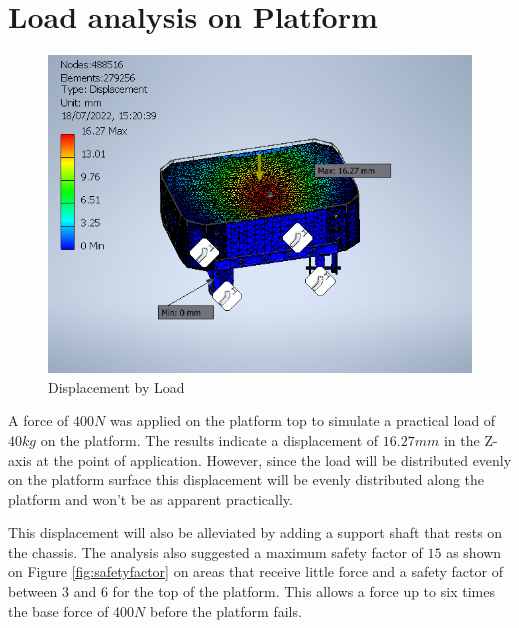 \section{Load analysis on Platform}

\begin{figure}[H]
    \centering
    \includegraphics[scale = 0.9]{Figures/PlatformDisplacement.png}
    \caption{Displacement by Load}
    \label{fig:platformdisplacement}
\end{figure}

A force of $400N$ was applied on the platform top to simulate a practical load of $40kg$ on the platform. The results indicate a displacement of $16.27mm$ in the Z-axis at the point of application. However, since the load will be distributed evenly on the platform surface this displacement will be evenly distributed along the platform and won't be as apparent practically.
\par
This displacement will also be alleviated by adding a support shaft that rests on the chassis. The analysis also suggested a maximum safety factor of $15$ as shown on Figure \ref{fig:safetyfactor} on areas that receive little force and a safety factor of between $3$ and $6$ for the top of the platform. This allows a force up to six times the base force of $400N$ before the platform fails.

